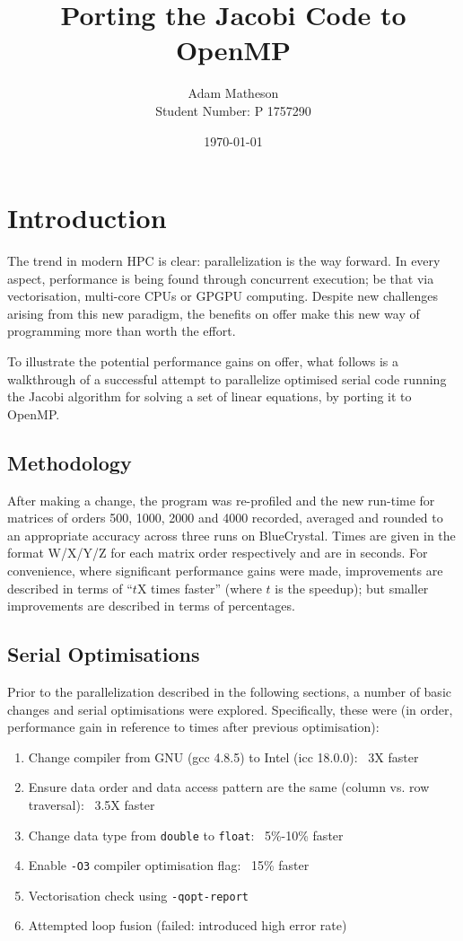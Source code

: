 \documentclass{article}
\begin{document}
\title{Porting the Jacobi Code to OpenMP}
\author{Adam Matheson \\
Student Number: P 1757290}
\date{\today}
\maketitle

\section{Introduction}
The trend in modern HPC is clear: parallelization is the way
forward. In every aspect, performance is being found through
concurrent execution; be that via vectorisation, multi-core CPUs or
GPGPU computing. Despite new challenges arising from this new
paradigm, the benefits on offer make this new way of programming more
than worth the effort.

To illustrate the potential performance gains on offer, what follows
is a walkthrough of a successful attempt to parallelize optimised
serial code running the Jacobi algorithm for solving a set of linear
equations, by porting it to OpenMP.

\subsection{Methodology} After making a change, the program was
re-profiled and the new run-time for matrices of orders 500, 1000,
2000 and 4000 recorded, averaged and rounded to an appropriate
accuracy across three runs on BlueCrystal. Times are given in the
format W/X/Y/Z for each matrix order respectively and are in
seconds. For convenience, where significant performance gains were
made, improvements are described in terms of ``\(t\)X times faster''
(where \(t\) is the speedup); but smaller improvements are described
in terms of percentages.

\subsection{Serial Optimisations}
Prior to the parallelization described in the following sections, a
number of basic changes and serial optimisations were
explored. Specifically, these were (in order, performance gain in
reference to times after previous optimisation):

\begin{enumerate}
\item Change compiler from GNU (gcc 4.8.5) to Intel (icc 18.0.0): ~3X
  faster
\item Ensure data order and data access pattern are the same (column
  vs. row traversal): ~3.5X faster
\item Change data type from \texttt{double} to \texttt{float}:
  ~5\%-10\% faster
\item Enable \texttt{-O3} compiler optimisation flag: ~15\% faster
\item Vectorisation check using \texttt{-qopt-report}
\item Attempted loop fusion (failed: introduced high error rate)
\end{enumerate}
\end{document}
